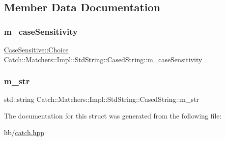 \subsection{Member Data Documentation}
\hypertarget{struct_catch_1_1_matchers_1_1_impl_1_1_std_string_1_1_cased_string_af399ed93051d8981e298206dee6898b3}{}\label{struct_catch_1_1_matchers_1_1_impl_1_1_std_string_1_1_cased_string_af399ed93051d8981e298206dee6898b3} 
\subsubsection{\texorpdfstring{m\+\_\+case\+Sensitivity}{m\_caseSensitivity}}
{\footnotesize\ttfamily \hyperlink{struct_catch_1_1_case_sensitive_aad49d3aee2d97066642fffa919685c6a}{Case\+Sensitive\+::\+Choice} Catch\+::\+Matchers\+::\+Impl\+::\+Std\+String\+::\+Cased\+String\+::m\+\_\+case\+Sensitivity}

\hypertarget{struct_catch_1_1_matchers_1_1_impl_1_1_std_string_1_1_cased_string_a9f8ce063a934330ac59bf8638f047e99}{}\label{struct_catch_1_1_matchers_1_1_impl_1_1_std_string_1_1_cased_string_a9f8ce063a934330ac59bf8638f047e99} 
\subsubsection{\texorpdfstring{m\+\_\+str}{m\_str}}
{\footnotesize\ttfamily std\+::string Catch\+::\+Matchers\+::\+Impl\+::\+Std\+String\+::\+Cased\+String\+::m\+\_\+str}



The documentation for this struct was generated from the following file\+:\begin{DoxyCompactItemize}
\item 
lib/\hyperlink{catch_8hpp}{catch.\+hpp}\end{DoxyCompactItemize}
